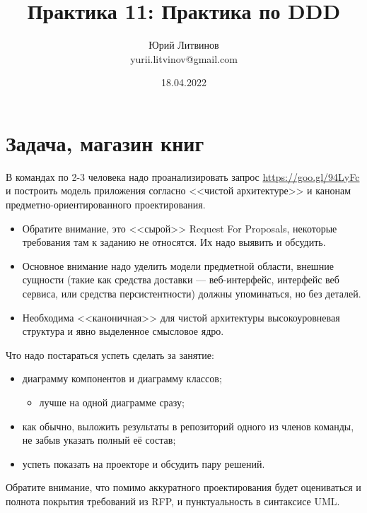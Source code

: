 \documentclass[a5paper]{article}
\title{Практика 11: Практика по DDD}
\author{Юрий Литвинов\\\small{yurii.litvinov@gmail.com}}
\date{18.04.2022}
\begin{document}
\maketitle
\thispagestyle{empty}

\section{Задача, магазин книг}

В командах по 2-3 человека надо проанализировать запрос \url{ https://goo.gl/94LyFc} и построить модель приложения согласно <<чистой архитектуре>> и канонам предметно-ориентированного проектирования.

\begin{itemize}
    \item Обратите внимание, это <<сырой>> Request For Proposals, некоторые требования там к заданию не относятся. Их надо выявить и обсудить.
    \item Основное внимание надо уделить модели предметной области, внешние сущности (такие как средства доставки --- веб-интерфейс, интерфейс веб сервиса, или средства персистентности) должны упоминаться, но без деталей.
    \item Необходима <<каноничная>> для чистой архитектуры высокоуровневая структура и явно выделенное смысловое ядро.
\end{itemize}

Что надо постараться успеть сделать за занятие:

\begin{itemize}
    \item диаграмму компонентов и диаграмму классов;
    \begin{itemize}
        \item лучше на одной диаграмме сразу;
    \end{itemize}
    \item как обычно, выложить результаты в репозиторий одного из членов команды, не забыв указать полный её состав;
    \item успеть показать на проекторе и обсудить пару решений.
\end{itemize}

Обратите внимание, что помимо аккуратного проектирования будет оцениваться и полнота покрытия требований из RFP, и пунктуальность в синтаксисе UML.
\end{document}

